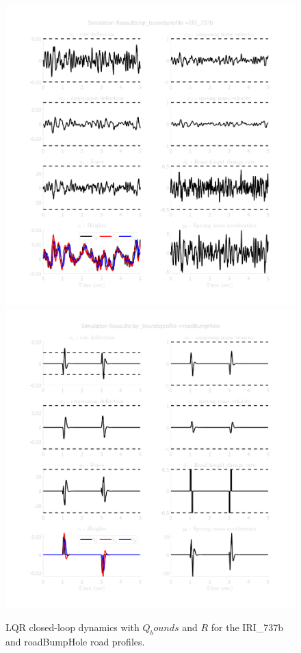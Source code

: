 \documentclass[]{IEEEtran}
\begin{document}
\begin{figure}[h]
    \centering
    \includegraphics[width = 0.49 \columnwidth]{figs/results_lqr_bounds_IRI_737b.png}
    \includegraphics[width = 0.49 \columnwidth]{figs/results_lqr_bounds_roadBumpHole.png}
    \caption{LQR closed-loop dynamics with $Q_bounds$ and $R$ for the IRI\_737b  and roadBumpHole road profiles.} \label{fig:lqr_bounds}
\end{figure}
\end{document}
